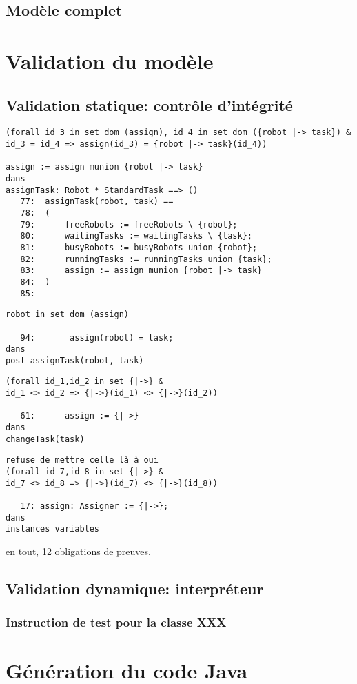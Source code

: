 \documentclass{article}
\begin{document}
\subsection{Modèle complet}

\section{Validation du modèle}
\subsection{Validation statique: contrôle d'intégrité}
\begin{verbatim}
(forall id_3 in set dom (assign), id_4 in set dom ({robot |-> task}) &
id_3 = id_4 => assign(id_3) = {robot |-> task}(id_4))

assign := assign munion {robot |-> task}
dans
assignTask: Robot * StandardTask ==> ()
   77: 	assignTask(robot, task) ==
   78: 	(
   79: 		freeRobots := freeRobots \ {robot};
   80: 		waitingTasks := waitingTasks \ {task};
   81: 		busyRobots := busyRobots union {robot};
   82: 		runningTasks := runningTasks union {task};
   83: 		assign := assign munion {robot |-> task}
   84: 	)
   85: 
\end{verbatim}
\begin{verbatim}
robot in set dom (assign)

   94: 	     assign(robot) = task;
dans
post assignTask(robot, task)
\end{verbatim}
\begin{verbatim}
(forall id_1,id_2 in set {|->} &
id_1 <> id_2 => {|->}(id_1) <> {|->}(id_2))

   61: 		assign := {|->}
dans
changeTask(task)
\end{verbatim}
\begin{verbatim}
refuse de mettre celle là à oui
(forall id_7,id_8 in set {|->} &
id_7 <> id_8 => {|->}(id_7) <> {|->}(id_8))

   17: assign: Assigner := {|->};
dans
instances variables
\end{verbatim}
en tout, 12 obligations de preuves.
\subsection{Validation dynamique: interpréteur}
\subsubsection{Instruction de test pour la classe XXX}

\section{Génération du code Java}
\end{document}
